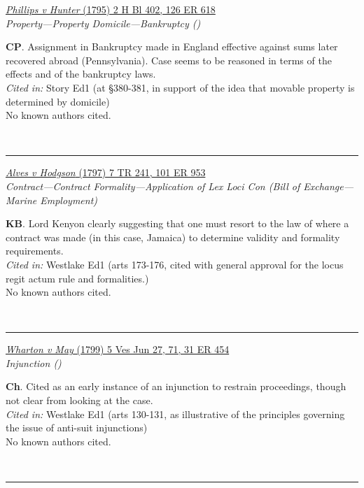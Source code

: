 \documentclass[twoside]{article}
\begin{document}
        \begin{small}
        \begin{center}
        \href{https://heinonline.org/HOL/P?h=hein.engrep/engrg0126&i=622}{\textit{Phillips v Hunter} (1795) 2 H Bl 402, 126 ER 618} \label{122} \\ 
\textit{Property---Property Domicile---Bankruptcy ()}\\
        \end{center}
        \textbf{CP}. Assignment in Bankruptcy made in England effective against sums later recovered abroad (Pennsylvania). Case seems to be reasoned in terms of the effects and of the bankruptcy laws.\\\textit{Cited in: }Story Ed1 (at §380-381, in support of the idea that movable property is determined by domicile)\\No known authors cited.
        \end{small}\\
        \rule{\textwidth}{0.5pt}
        

        \begin{small}
        \begin{center}
        \href{https://heinonline.org/HOL/P?h=hein.engrep/engrf0101&i=957}{\textit{Alves v Hodgson} (1797) 7 TR 241, 101 ER 953} \label{58} \\ 
\textit{Contract---Contract Formality---Application of Lex Loci Con (Bill of Exchange---Marine Employment)}\\
        \end{center}
        \textbf{KB}. Lord Kenyon clearly suggesting that one must resort to the law of where a contract was made (in this case, Jamaica) to determine validity and formality requirements.\\\textit{Cited in: }Westlake Ed1 (arts 173-176, cited with general approval for the locus regit actum rule and formalities.)\\No known authors cited.
        \end{small}\\
        \rule{\textwidth}{0.5pt}
        

        \begin{small}
        \begin{center}
        \href{https://heinonline.org/HOL/P?h=hein.engrep/engrc0031&i=462https://heinonline.org/HOL/Page?handle=hein.engrep/engrc0031&id=462}{\textit{Wharton v May} (1799) 5 Ves Jun 27, 71, 31 ER 454} \label{64} \\ 
\textit{Injunction ()}\\
        \end{center}
        \textbf{Ch}. Cited as an early instance of an injunction to restrain proceedings, though not clear from looking at the case.\\\textit{Cited in: }Westlake Ed1 (arts 130-131, as illustrative of the principles governing the issue of anti-suit injunctions)\\No known authors cited.
        \end{small}\\
        \rule{\textwidth}{0.5pt}
        
\end{document}
